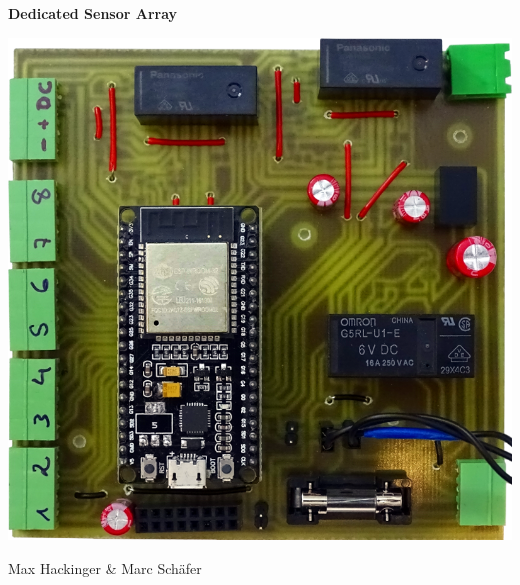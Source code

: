 %
%
\begin{titlepage}
	\begin{center}
		{\Huge \bfseries Dedicated Sensor Array }
		
		\vspace{4cm}
		
		\begin{center}
			\includegraphics[width=0.5\linewidth]{../../pictures/sensorstation/small/DSC00289.png}
		\end{center}

		\vfill
		
		
		{\normalsize \newtoday } 
		
		{\normalsize Max Hackinger \& Marc Schäfer}
		
		
		
	\end{center}
	\noindent
	\begin{flushleft} 
	\end{flushleft}
\end{titlepage}